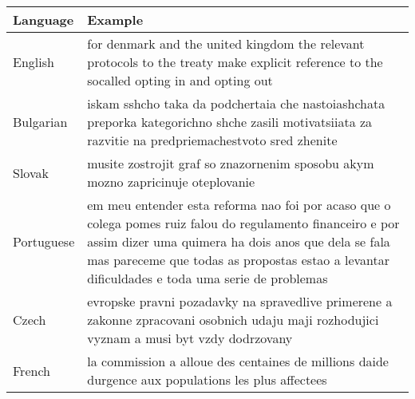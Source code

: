 \begin{tabularx}{\columnwidth}{XX}
\toprule
Language & Example \\
\midrule
English & for denmark and the united kingdom the relevant protocols to the treaty make explicit reference to the socalled opting in and opting out \\
Bulgarian & iskam sshcho taka da podchertaia che nastoiashchata preporka kategorichno shche zasili motivatsiiata za razvitie na predpriemachestvoto sred zhenite \\
Slovak & musite zostrojit graf so znazornenim sposobu akym mozno zapricinuje oteplovanie \\
Portuguese & em meu entender esta reforma nao foi por acaso que o colega pomes ruiz falou do regulamento financeiro e por assim dizer uma quimera ha dois anos que dela se fala mas pareceme que todas as propostas estao a levantar dificuldades e toda uma serie de problemas \\
Czech & evropske pravni pozadavky na spravedlive primerene a zakonne zpracovani osobnich udaju maji rozhodujici vyznam a musi byt vzdy dodrzovany \\
French & la commission a alloue des centaines de millions daide durgence aux populations les plus affectees \\
\bottomrule
\end{tabularx}
